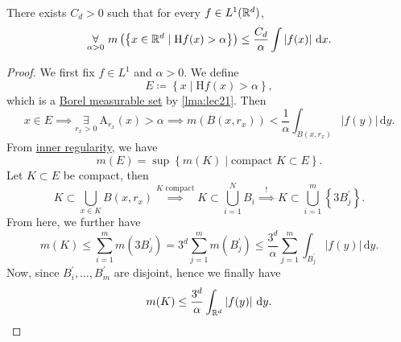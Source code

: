 \begin{theorem}\label{thm:HL-maximal-inequality}
  There exists \(C_{d} >0\) such that for every \(f\in L^1(\mathbb{\MakeUppercase{r}} ^d)\),
  \[
    \underset{\alpha >0}{\forall }\ m\left(\left\{x\in \mathbb{\MakeUppercase{r}} ^d\mid \mathrm{H}f(x) > \alpha  \right\}\right) \leq \frac{C_{d} }{\alpha }\int \left\vert f(x) \right\vert \,\mathrm{d} x.
  \]
\end{theorem}
\begin{proof}
  We first fix \(f\in L^1\) and \(\alpha >0\). We define
  \[
    E\coloneqq \left\{x\mid \mathrm{H}f (x) > \alpha \right\},
  \]
  which is a \hyperref[def:measurable-set]{Borel measurable set} by \autoref{lma:lec21}. Then
  \[
    x\in E\implies \underset{r_{x} >0}{\exists } \ \mathrm{A} _{r_{x} }(x)> \alpha \implies m(B(x, r_{x} ))< \frac{1}{\alpha }\int _{B(x, r_{x} )}\left\vert f(y) \right\vert \,\mathrm{d} y.
  \]
  From \hyperref[thm:inner-regularity]{inner regularity}, we have
  \[
    m(E) = \sup \left\{m(K)\mid \text{compact }K\subset E \right\}.
  \]
  Let \(K\subset E\) be compact, then
  \[
    K\subset \bigcup\limits_{x\in K}B(x, r_{x} ) \overset{K \text{ compact} }{\implies } K\subset \bigcup\limits_{i=1}^{N} B_{i} \overset{\hyperref[lma:Vitali-type-covering-lemma]{!}}{\implies} K\subset \bigcup\limits_{i=1}^{m} \left\{3 B_{j} ^\prime \right\}.
  \]
  From here, we further have
  \[
    m(K) \leq \sum\limits_{i=1}^{m} m(3 B_{j} ^\prime ) = 3^d \sum\limits_{j=1}^{m} m(B_{j} ^\prime ) \leq \frac{3^d}{\alpha }\sum\limits_{j=1}^{m} \int _{B_{j} ^\prime }\left\vert f(y) \right\vert \,\mathrm{d}y.
  \]
  Now, since \(B^\prime _{i} , \ldots , B^\prime _{m}  \) are disjoint, hence we finally have
  \[
    m(K) \leq \frac{3^d}{\alpha }\int _{\mathbb{\MakeUppercase{r}} ^d}\left\vert f(y) \right\vert \,\mathrm{d} y.
  \]
\end{proof}